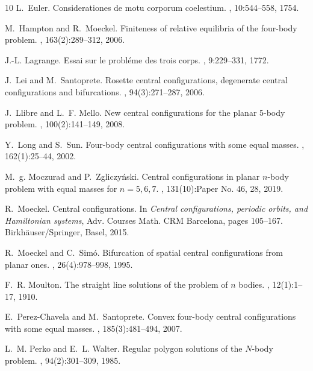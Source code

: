 \documentclass[final,11pt]{article}
\numberwithin{equation}{section}
\theoremstyle{definition}
\begin{document}
\begin{thebibliography}{10}
L.~Euler.
\newblock Considerationes de motu corporum coelestium.
,
  10:544--558, 1754.

M.~Hampton and R.~Moeckel.
\newblock Finiteness of relative equilibria of the four-body problem.
, 163(2):289--312, 2006.

J.-L. Lagrange.
\newblock Essai sur le probl{\'e}me des trois corps.
,
  9:229--331, 1772.

J.~Lei and M.~Santoprete.
\newblock Rosette central configurations, degenerate central configurations and
  bifurcations.
, 94(3):271--287, 2006.

J.~Llibre and L.~F. Mello.
\newblock New central configurations for the planar 5-body problem.
, 100(2):141--149,
  2008.

Y.~Long and S.~Sun.
\newblock Four-body central configurations with some equal masses.
, 162(1):25--44, 2002.

M.~g. Moczurad and P.~Zgliczy\'{n}ski.
\newblock Central configurations in planar {$n$}-body problem with equal masses
  for {$n=5,6,7$}.
, 131(10):Paper No. 46, 28,
  2019.

R.~Moeckel.
\newblock Central configurations.
\newblock In {\em Central configurations, periodic orbits, and {H}amiltonian
  systems}, Adv. Courses Math. CRM Barcelona, pages 105--167.
  Birkh\"{a}user/Springer, Basel, 2015.

R.~Moeckel and C.~Sim\'{o}.
\newblock Bifurcation of spatial central configurations from planar ones.
, 26(4):978--998, 1995.

F.~R. Moulton.
\newblock The straight line solutions of the problem of {$n$} bodies.
, 12(1):1--17, 1910.

E.~Perez-Chavela and M.~Santoprete.
\newblock Convex four-body central configurations with some equal masses.
, 185(3):481--494, 2007.

L.~M. Perko and E.~L. Walter.
\newblock Regular polygon solutions of the {$N$}-body problem.
, 94(2):301--309, 1985.


\end{thebibliography}
\end{document}
